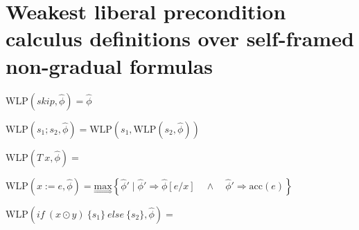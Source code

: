 \documentclass {article}
\newcommand{\eif}[3]{if \ ( #1 ) \ \{ #2 \} \ else \ \{#3\}}
\newcommand{\fphi}{\widehat{\phi}}
\newcommand{\acc}[1]{\text{acc}(#1)}
\newcommand{\imp}{\Rightarrow}
\newcommand{\maximp}[2]{\underset{\Rightarrow}{\text{max}}\left\{#1 \mid #2\right\}}
\newcommand{\wlp}[2]{\text{WLP}(#1,#2)}
\begin{document}

\section{Weakest liberal precondition calculus definitions over self-framed non-gradual formulas}
\hspace{0.5cm}

$\wlp{skip}{\fphi} = \fphi  $

\vspace{0.5cm}

$\wlp{s_1;s_2}{\fphi} = \wlp{s_1}{\wlp{s_2}{\fphi}} $

\vspace{0.5cm}



$\wlp{T\ x}{\fphi} = $

$\wlp{x := e}{\fphi} =\maximp{\fphi'}{\fphi' \imp \fphi[e/x] \quad \wedge \quad \fphi' \imp \acc{e}} $

\vspace{0.5cm}

$\wlp{\eif{x \odot y}{s_1}{s_2}}{\fphi} = $


\vspace{0.5cm}
\end{document}

